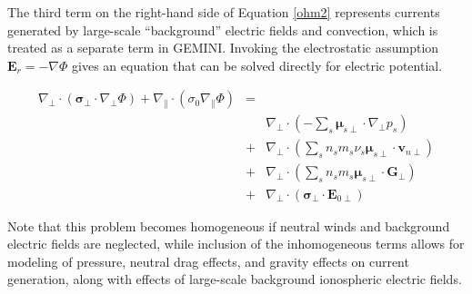 \documentclass[11pt,letterpaper]{article}
\begin{document}
The third term on the right-hand side of Equation \ref{ohm2} represents currents generated by large-scale ``background'' electric fields and convection, which is treated as a separate term in GEMINI.  Invoking the electrostatic assumption $\mathbf{E}_r = -\nabla \Phi$ gives an equation that can be solved directly for electric potential.
\begin{linenomath*} \begin{eqnarray}
\nabla_\perp \cdot \left( \boldsymbol{\sigma}_\perp \cdot \nabla_\perp \Phi \right) + \nabla_\parallel \cdot \left( \sigma_0 \nabla_\parallel \Phi \right)  &=&  \nonumber \\
& & \nabla_\perp \cdot \left(  - \sum_s \boldsymbol{\mu}_{s\perp} \cdot \nabla_\perp p_s \right) \nonumber \\
&+& \nabla_\perp \cdot \left(  \sum_s n_s m_s \nu_s \boldsymbol{\mu}_{s\perp} \cdot \mathbf{v}_{n\perp} \right) \nonumber \\
&+& \nabla_\perp \cdot \left(  \sum_s n_s m_s  \boldsymbol{\mu}_{s\perp} \cdot \mathbf{G}_\perp \right)  \nonumber \\
&+& \nabla_\perp \cdot \left( \boldsymbol{\sigma}_\perp \cdot \mathbf{E}_{0\perp} \right) \label{divJSS2}
\end{eqnarray} \end{linenomath*}
Note that this problem becomes homogeneous if neutral winds and background electric fields are neglected, while inclusion of the inhomogeneous terms allows for modeling of pressure, neutral drag effects, and gravity effects on current generation, along with effects of large-scale background ionospheric electric fields.



\end{document}
